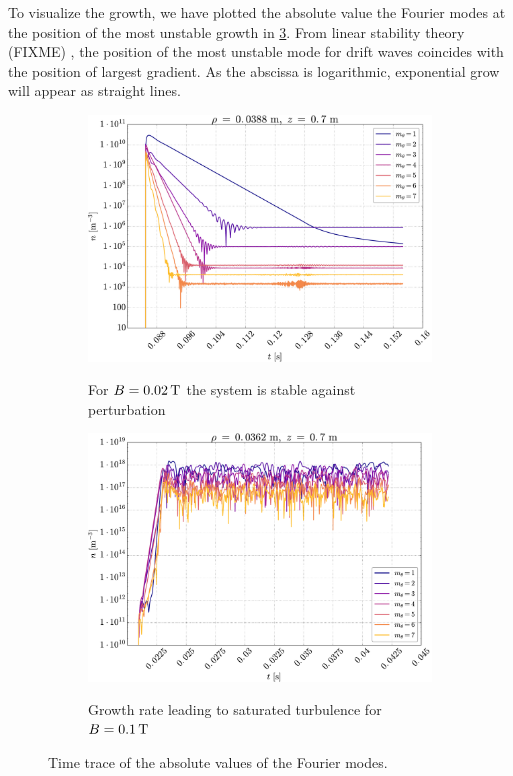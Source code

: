 To visualize the growth, we have plotted the absolute value the Fourier modes at the position of the most unstable growth in \cref{fig:fourierDens}.
From linear stability theory (FIXME)
, the position of the most unstable mode for drift waves coincides with the position of largest gradient.
As the abscissa is logarithmic, exponential grow will appear as straight lines.
%
\begin{figure}[h!]
    \centering
    \begin{subfigure}[h]{0.48\textwidth}
        \centering
        \includegraphics[width=1.0\textwidth]{fig/results/fourierModes/stable}
        \label{fig:fourierStable}
        \caption{For $B=0.02\, \text{T}$ the system is stable against perturbation}
    \end{subfigure}%
    \hfill
    \begin{subfigure}[h]{0.48\textwidth}
        \centering
        \includegraphics[width=1.0\textwidth]{fig/results/fourierModes/unstable}
        \label{fig:fourierUnstable}
        \caption{Growth rate leading to saturated turbulence for $B=0.1\, \text{T}$}
    \end{subfigure}
    \caption{Time trace of the absolute values of the Fourier modes.}
    \label{fig:fourierDens}
\end{figure}
